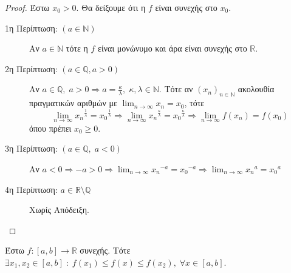 \documentclass[main.tex]{subfiles}
\begin{document}
\begin{proof}
    Έστω $ x_{0}>0 $. Θα δείξουμε ότι η $f$ είναι συνεχής στο $ x_{0} $.
    \begin{description}
        \item [1η Περίπτωση: $(a \in \mathbb{N})$]
            Αν $ a \in \mathbb{N} $ τότε η $ f $ είναι μονώνυμο και άρα είναι 
            συνεχής στο $ \mathbb{R} $.
        \item [2η Περίπτωση: $(a \in \mathbb{Q}, a>0)$]
            Αν $ a \in \mathbb{Q}, \; a >0  \Rightarrow a = \frac{\kappa}{\lambda}, \; 
            \kappa, \lambda \in \mathbb{N} $. Τότε αν $ {(x_{n})}_{n \in \mathbb{N}} $ 
            ακολουθία πραγματικών αριθμών με $ \lim_{n \to \infty} x_{n} = x_{0} $, τότε
            \[
                \lim_{n \to \infty} {x_{n}}^{\frac{1}{\lambda}} = 
                {x_{0}}^{\frac{1}{\lambda}} \Rightarrow \lim_{n \to \infty} 
                {x_{n}}^{\frac{\kappa}{\lambda} } = {x_{0}}^{\frac{\kappa}{\lambda}} 
                \Rightarrow \lim_{n \to \infty} f(x_{n}) = f(x_{0})
            \] 
            όπου πρέπει $ x_{0} \geq 0 $.
        \item [3η Περίπτωση: $(a \in \mathbb{Q}, \; a<0) $]
            Αν $ a<0 \Rightarrow -a>0 \Rightarrow \lim_{n \to \infty} {x_{n}}^{-a} = 
            {x_{0}}^{-a} \Rightarrow \lim_{n \to \infty} {x_{n}}^{a} = {x_{0}}^{a} $
        \item [4η Περίπτωση: $ a \in \mathbb{R} \setminus \mathbb{Q} $] 
            Χωρίς Απόδειξη.
    \end{description}
\end{proof}

\begin{thm}
    Έστω $ f \colon [a,b] \to \mathbb{R} $ συνεχής. Τότε $ \exists x_{1}, x_{2} \in 
    [a,b] \; : \; f(x_{1}) \leq f(x) \leq f(x_{2}), \; \forall x \in [a,b]$.
\end{thm}
\end{document}
